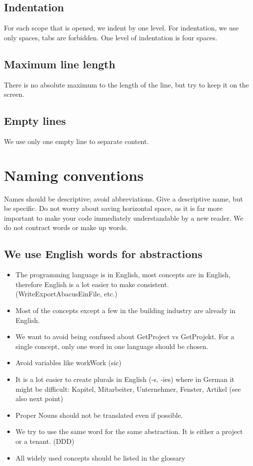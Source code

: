 \documentclass[11pt,a4paper]{article}
\begin{document}
\subsection{Indentation}

For each scope that is opened, we indent by one level.
For indentation, we use only spaces, tabs are forbidden.
One level of indentation is four spaces.

\subsection{Maximum line length}

There is no absolute maximum to the length of the line, but try to keep it on the screen.

\subsection{Empty lines}

We use only one empty line to separate content.

\section{Naming conventions}

Names should be descriptive; avoid abbreviations.
Give a descriptive name, but be specific. Do not worry about saving horizontal space, as it is far more important to make your code immediately understandable by a new reader. We do not contract words or make up words.

\subsection{We use English words for abstractions}
\begin{itemize}[itemsep=0pt]
  \item The programming language is in English, most concepts are in English, therefore English is a lot easier to make consistent. (WriteExportAbacusEinFile, etc.)
  \item Most of the concepts except a few in the building industry are already in English.
  \item We want to avoid being confused about GetProject vs GetProjekt. For a single concept, only one word in one language should be chosen.
  \item Avoid variables like workWork (sic)
  \item It is a lot easier to create plurals in English (-s, -ies) where in German it might be difficult: Kapitel, Mitarbeiter, Unternehmer, Fenster, Artikel (see also next point)
  \item Proper Nouns  should not be translated even if possible.
  \item We try to use the same word for the same abstraction. It is either a project or a tenant. (DDD)
  \item All widely used concepts should be listed in the glossary
\end{itemize}
\end{document}
